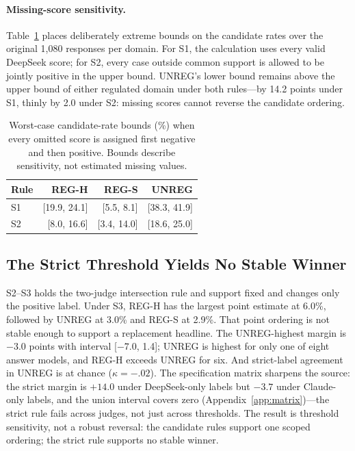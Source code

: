 \documentclass[11pt]{article}
\begin{document}
\paragraph{Missing-score sensitivity.}
Table~\ref{tab:missing} places deliberately extreme bounds on the candidate rates over the original 1,080 responses per domain. For S1, the calculation uses every valid DeepSeek score; for S2, every case outside common support is allowed to be jointly positive in the upper bound. UNREG's lower bound remains above the upper bound of either regulated domain under both rules---by 14.2 points under S1, thinly by 2.0 under S2: missing scores cannot reverse the candidate ordering.

\begin{table}[t]
\centering
\small
\setlength{\tabcolsep}{4pt}
\begin{tabular}{@{}lrrr@{}}
\toprule
Rule & REG-H & REG-S & UNREG \\
\midrule
S1 & [19.9, 24.1] & [5.5, 8.1] & [38.3, 41.9] \\
S2 & [8.0, 16.6] & [3.4, 14.0] & [18.6, 25.0] \\
\bottomrule
\end{tabular}
\caption{Worst-case candidate-rate bounds (\%) when every omitted score is assigned first negative and then positive. Bounds describe sensitivity, not estimated missing values.}
\label{tab:missing}
\end{table}

\subsection{The Strict Threshold Yields No Stable Winner}
\label{subsec:strict}

S2--S3 holds the two-judge intersection rule and support fixed and changes only the positive label. Under S3, REG-H has the largest point estimate at 6.0\%, followed by UNREG at 3.0\% and REG-S at 2.9\%. That point ordering is not stable enough to support a replacement headline. The UNREG-highest margin is $-3.0$ points with interval [$-7.0$, 1.4]; UNREG is highest for only one of eight answer models, and REG-H exceeds UNREG for six. And strict-label agreement in UNREG is at chance ($\kappa=-.02$). The specification matrix sharpens the source: the strict margin is $+14.0$ under DeepSeek-only labels but $-3.7$ under Claude-only labels, and the union interval covers zero (Appendix~\ref{app:matrix})---the strict rule fails across judges, not just across thresholds. The result is threshold sensitivity, not a robust reversal: the candidate rules support one scoped ordering; the strict rule supports no stable winner.
\end{document}
